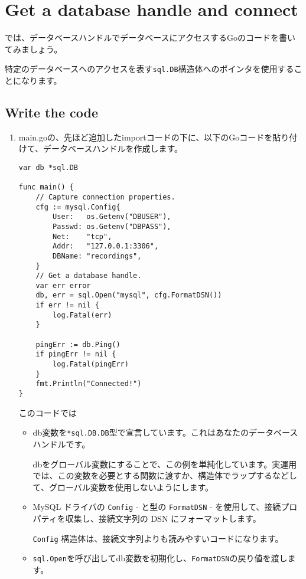 \section{Get a database handle and connect}

では、データベースハンドルでデータベースにアクセスするGoのコードを書いてみましょう。

特定のデータベースへのアクセスを表す\texttt{sql.DB}構造体へのポインタを使用することになります。

\subsection{Write the code}

\begin{enumerate}
\item main.goの、先ほど追加したimportコードの下に、以下のGoコードを貼り付けて、データベースハンドルを作成します。

\begin{lstlisting}[numbers=none]
var db *sql.DB

func main() {
    // Capture connection properties.
    cfg := mysql.Config{
        User:   os.Getenv("DBUSER"),
        Passwd: os.Getenv("DBPASS"),
        Net:    "tcp",
        Addr:   "127.0.0.1:3306",
        DBName: "recordings",
    }
    // Get a database handle.
    var err error
    db, err = sql.Open("mysql", cfg.FormatDSN())
    if err != nil {
        log.Fatal(err)
    }

    pingErr := db.Ping()
    if pingErr != nil {
        log.Fatal(pingErr)
    }
    fmt.Println("Connected!")
}
\end{lstlisting}

このコードでは
\begin{itemize}
\item db変数を\texttt{*sql.DB.DB}型で宣言しています。これはあなたのデータベースハンドルです。

dbをグローバル変数にすることで、この例を単純化しています。実運用では、この変数を必要とする関数に渡すか、構造体でラップするなどして、グローバル変数を使用しないようにします。

\item MySQL ドライバの \texttt{Config} - と型の \texttt{FormatDSN} - を使用して、接続プロパティを収集し、接続文字列の DSN にフォーマットします。

\texttt{Config} 構造体は、接続文字列よりも読みやすいコードになります。

\item \texttt{sql.Open}を呼び出してdb変数を初期化し、\texttt{FormatDSN}の戻り値を渡します。


\end{itemize}
\end{enumerate}
